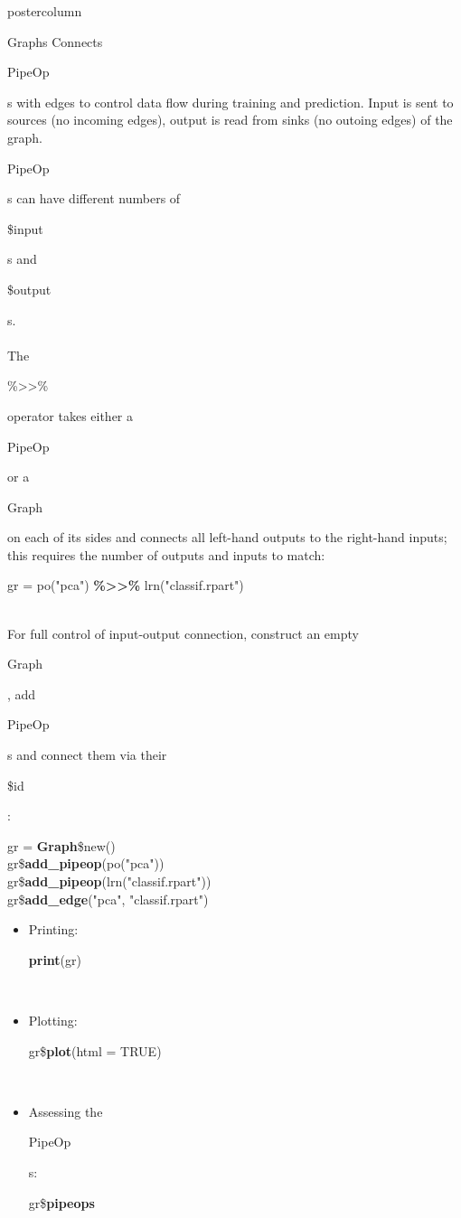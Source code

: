 \documentclass{beamer}
\newcommand{\codeinline}[1]{\begin{codeboxinline}#1\end{codeboxinline}}
\begin{document}
\begin{frame}[fragile]{}
\begin{columns}
\begin{column}{.245\textwidth}
\begin{beamercolorbox}[center]{postercolumn}
\begin{minipage}{.98\textwidth}
{\begin{myblock}{Graphs}
              Connects \codeinline{PipeOp}s with edges to control data flow during training and prediction. Input is sent to sources (no incoming edges), output is read from sinks (no outoing edges) of the graph. \codeinline{PipeOp}s can have different numbers of \codeinline{\$input}s and  \codeinline{\$output}s.\\
              \ \\
              The \codeinline{\%>{}>\%} operator takes either a \codeinline{PipeOp} or a \codeinline{Graph} on each of its sides and connects all left-hand outputs to the right-hand inputs; this requires the number of outputs and inputs to match:
              \begin{codebox}
                gr = po("pca") \textbf{\%>{}>\%} lrn("classif.rpart")
              \end{codebox}
              \ \\
              For full control of input-output connection, construct an empty \codeinline{Graph}, add \codeinline{PipeOp}s and connect them via their \codeinline{\$id}:
              \begin{codeboxmultiline}[width=23cm]
                gr = \textbf{Graph}\$new()\\
                gr\$\textbf{add\_pipeop}(po("pca"))\\
                gr\$\textbf{add\_pipeop}(lrn("classif.rpart"))\\
                gr\$\textbf{add\_edge}("pca", "classif.rpart")
              \end{codeboxmultiline}
              \leavevmode
              \begin{itemize}
                \item Printing: \codeinline{\textbf{print}(gr)}\\
                \item Plotting: \codeinline{gr\$\textbf{plot}(html = TRUE)}\\
                \item Assessing the \codeinline{PipeOp}s: \codeinline{gr\$\textbf{pipeops}}

\end{itemize}
\end{myblock}}
\end{minipage}
\end{beamercolorbox}
\end{column}
\end{columns}
\end{frame}
\end{document}
